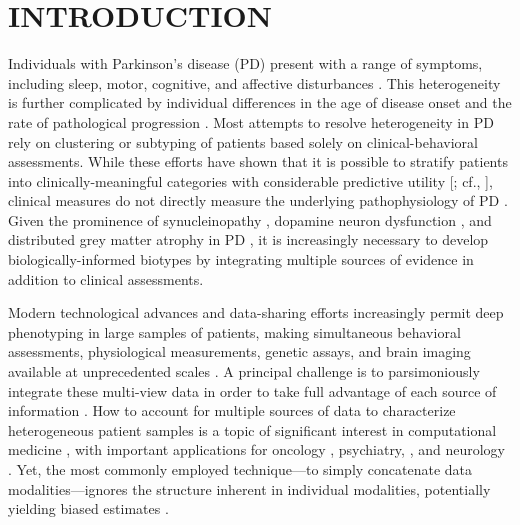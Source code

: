 \documentclass[12pt,aps,pra,reprint,showkeys]{revtex4-1}
\begin{document}
\maketitle

\section*{INTRODUCTION}

Individuals with Parkinson’s disease (PD) present with a range of symptoms, including sleep, motor, cognitive, and affective disturbances \citep{postuma2015movementdisorders}.
This heterogeneity is further complicated by individual differences in the age of disease onset and the rate of pathological progression \citep{kalia2015parkinson, tysnes2017epidemiology}. Most attempts to resolve heterogeneity in PD rely on clustering or subtyping of patients based solely on clinical-behavioral assessments.
While these efforts have shown that it is possible to stratify patients into clinically-meaningful categories with considerable predictive utility [; cf., ], clinical measures do not directly measure the underlying pathophysiology of PD \citep{espay2017biomarker}.
Given the prominence of synucleinopathy \citep{fujiwara2002natcellbiol, luk2012science}, dopamine neuron dysfunction \citep{fearnley1991ageing}, and distributed grey matter atrophy in PD \citep{zeighami2015network, zeighami2017clinical, yau2017network}, it is increasingly necessary to develop biologically-informed biotypes by integrating multiple sources of evidence in addition to clinical assessments.

Modern technological advances and data-sharing efforts increasingly permit deep phenotyping in large samples of patients, making simultaneous behavioral assessments, physiological measurements, genetic assays, and brain imaging available at unprecedented scales \citep{marek2011progneurobiol}.
A principal challenge is to parsimoniously integrate these multi-view data in order to take full advantage of each source of information \citep{misic2016curropinneurobiol}.
How to account for multiple sources of data to characterize heterogeneous patient samples is a topic of significant interest in computational medicine \citep{kirk2012bioninformatics, monti2003machinelearning}, with important applications for oncology \citep{nigro2005cancerres, wang2014similarity}, psychiatry, \citep{marquand2016biolpsychiat, stefanik2018brain, jacobs2020integration}, and neurology \citep{espay2017biomarker}.
Yet, the most commonly employed technique---to simply concatenate data modalities---ignores the structure inherent in individual modalities, potentially yielding biased estimates \citep{wang2014similarity,zitnik2019informationfusion}.
\end{document}
